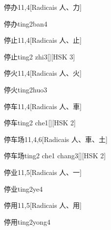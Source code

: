 \begin{entry}{停办}{11,4}[Radicais ⼈、⼒]
  \begin{phonetics}{停办}{ting2ban4}
  \end{phonetics}
\end{entry}

\begin{entry}{停止}{11,4}[Radicais ⼈、⽌]
  \begin{phonetics}{停止}{ting2 zhi3}[][HSK 3]
  \end{phonetics}
\end{entry}

\begin{entry}{停火}{11,4}[Radicais ⼈、⽕]
  \begin{phonetics}{停火}{ting2huo3}
  \end{phonetics}
\end{entry}

\begin{entry}{停车}{11,4}[Radicais ⼈、⾞]
  \begin{phonetics}{停车}{ting2 che1}[][HSK 2]
  \end{phonetics}
\end{entry}

\begin{entry}{停车场}{11,4,6}[Radicais ⼈、⾞、⼟]
  \begin{phonetics}{停车场}{ting2 che1 chang3}[][HSK 2]
  \end{phonetics}
\end{entry}

\begin{entry}{停业}{11,5}[Radicais ⼈、⼀]
  \begin{phonetics}{停业}{ting2ye4}
  \end{phonetics}
\end{entry}

\begin{entry}{停用}{11,5}[Radicais ⼈、⽤]
  \begin{phonetics}{停用}{ting2yong4}
  \end{phonetics}
\end{entry}

